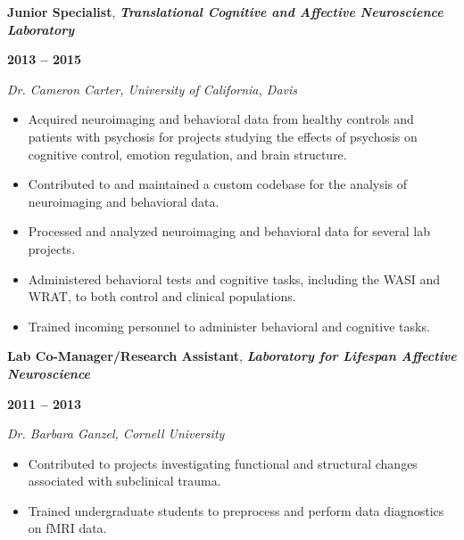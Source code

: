 \documentclass[10pt]{article}
\begin{document}
\bigskip

\begin{minipage}[t]{.85\linewidth}
\flushleft
\noindent
\textbf{Junior Specialist}, \emph{\textbf{Translational Cognitive and Affective Neuroscience Laboratory}}
\end{minipage}
\hfill
\begin{minipage}[t]{.15\linewidth}
\flushright
\noindent
\textsc{\textbf{2013 -- 2015}}
\end{minipage}

\emph{Dr. Cameron Carter, University of California, Davis}

\begin{itemize}[noitemsep, nolistsep]
\item
  Acquired neuroimaging and behavioral data from healthy controls and
  patients with psychosis for projects studying the effects of psychosis
  on cognitive control, emotion regulation, and brain structure.
\item
  Contributed to and maintained a custom codebase for the analysis of
  neuroimaging and behavioral data.
\item
  Processed and analyzed neuroimaging and behavioral data for several
  lab projects.
\item
  Administered behavioral tests and cognitive tasks, including the WASI
  and WRAT, to both control and clinical populations.
\item
  Trained incoming personnel to administer behavioral and cognitive
  tasks.
\end{itemize}

\bigskip

\begin{minipage}[t]{.85\linewidth}
\flushleft
\noindent
\textbf{Lab Co-Manager/Research Assistant}, \emph{\textbf{Laboratory for
Lifespan Affective Neuroscience}}
\end{minipage}
\hfill
\begin{minipage}[t]{.15\linewidth}
\flushright
\noindent
\textsc{\textbf{2011 -- 2013}}
\end{minipage}

\emph{Dr. Barbara Ganzel, Cornell University}

\begin{itemize}[noitemsep, nolistsep]
\item
  Contributed to projects investigating functional and structural
  changes associated with subclinical trauma.
\item
  Trained undergraduate students to preprocess and perform data
  diagnostics on fMRI data.
\end{itemize}
\end{document}
